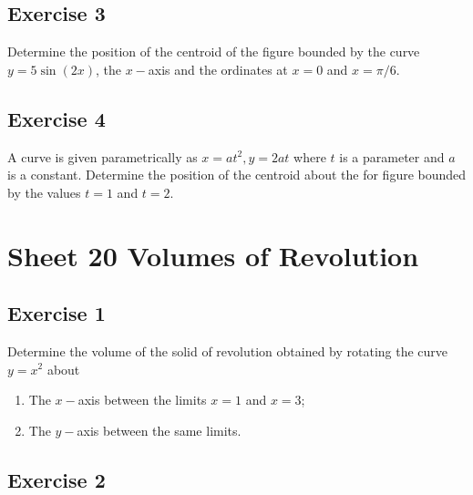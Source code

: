 \documentclass[
  11pt,
  oneside]{book}
\providecommand{\tightlist}{%
  \setlength{\itemsep}{0pt}\setlength{\parskip}{0pt}}
\newcommand{\slide}{}
\theoremstyle{definition}
\theoremstyle{definition}
\theoremstyle{definition}
\theoremstyle{definition}
\theoremstyle{remark}
\begin{document}
\slide

\subsection*{Exercise 3}\label{exercise-3-8}

Determine the position of the centroid of the figure bounded by the curve \(y = 5\sin(2x)\), the \(x-\)axis and the ordinates at \(x = 0\) and \(x = \pi/6\).

\slide

\subsection*{Exercise 4}\label{exercise-4-6}

A curve is given parametrically as \(x = at^2, y = 2at\) where \(t\) is a parameter and \(a\) is a constant. Determine the position of the centroid about the for figure bounded by the values \(t = 1\) and \(t = 2\).

\slide

\section{Sheet 20 Volumes of Revolution}\label{sheet-20-volumes-of-revolution}

\slide

\subsection*{Exercise 1}\label{exercise-1-11}

Determine the volume of the solid of revolution obtained by rotating the curve \(y = x^2\) about

\begin{enumerate}
\def\labelenumi{\arabic{enumi}.}
\tightlist
\item
  The \(x-\)axis between the limits \(x = 1\) and \(x = 3\);
\item
  The \(y-\)axis between the same limits.
\end{enumerate}

\slide

\subsection*{Exercise 2}\label{exercise-2-11}
\end{document}
